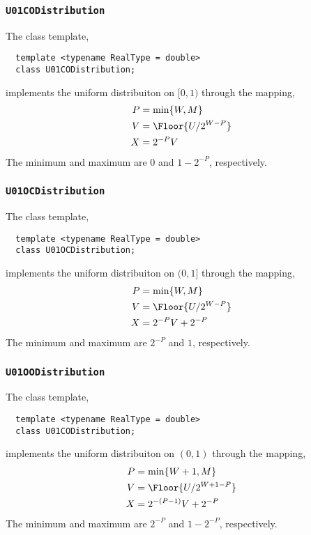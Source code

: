 \subsubsection{\texttt{U01CODistribution}}

The class template,
\begin{Verbatim}
  template <typename RealType = double>
  class U01CODistribution;
\end{Verbatim}
implements the uniform distribuiton on $[0, 1)$ through the mapping,
\begin{align*}
  P &= \min\{W, M\} \\
  V &= \Floor{U / 2^{W - P}} \\
  X &= 2^{-P} V
\end{align*}
The minimum and maximum are $0$ and $1 - 2^{-P}$, respectively.

\subsubsection{\texttt{U01OCDistribution}}

The class template,
\begin{Verbatim}
  template <typename RealType = double>
  class U01OCDistribution;
\end{Verbatim}
implements the uniform distribuiton on $(0, 1]$ through the mapping,
\begin{align*}
  P &= \min\{W, M\} \\
  V &= \Floor{U / 2^{W - P}} \\
  X &= 2^{-P} V + 2^{-P}
\end{align*}
The minimum and maximum are $2^{-P}$ and $1$, respectively.

\subsubsection{\texttt{U01OODistribution}}

The class template,
\begin{Verbatim}
  template <typename RealType = double>
  class U01CODistribution;
\end{Verbatim}
implements the uniform distribuiton on $(0, 1)$ through the mapping,
\begin{align*}
  P &= \min\{W + 1, M\} \\
  V &= \Floor{U / 2^{W + 1 - P}} \\
  X &= 2^{-(P - 1)} V + 2^{-P}
\end{align*}
The minimum and maximum are $2^{-P}$ and $1 - 2^{-P}$, respectively.

